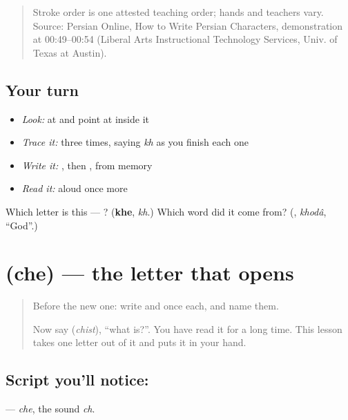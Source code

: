 \begin{quote}
Stroke order is one attested teaching order; hands and teachers vary. Source: Persian Online, How to Write Persian Characters,  demonstration at 00:49–00:54 (Liberal Arts Instructional Technology Services, Univ. of Texas at Austin).
\end{quote}

\subsection*{Your turn}
\begin{itemize}
\raggedright
  \item \emph{Look:} at \textbf{} and point at  inside it
  \item \emph{Trace it:}  three times, saying \emph{kh} as you finish each one
  \item \emph{Write it:} , then , from memory
  \item \emph{Read it:} \textbf{} aloud once more
\end{itemize}

\begin{tcolorbox}[breakable,colback=teal!4,colframe=teal!35!black,title={Before you move on}]
Which letter is this — ? (\textbf{khe}, \emph{kh}.) Which word did it come from? (\textbf{}, \emph{khodâ}, \textquotedblleft{}God\textquotedblright{}.)
\end{tcolorbox}
\section[\texorpdfstring{\fa{چ} (che)}{چ (che)}]{ (che) — the letter that opens }

\label{lesson:FA-W23-che}



\begin{quote}
Before the new one: write  and  once each, and name them.

Now say \textbf{} (\emph{chist}), \textquotedblleft{}what is?\textquotedblright{}. You have read it for a long time. This lesson takes one letter out of it and puts it in your hand.
\end{quote}

\subsection*{Script you'll notice: }
\textbf{} — \emph{che}, the sound \emph{ch}.

